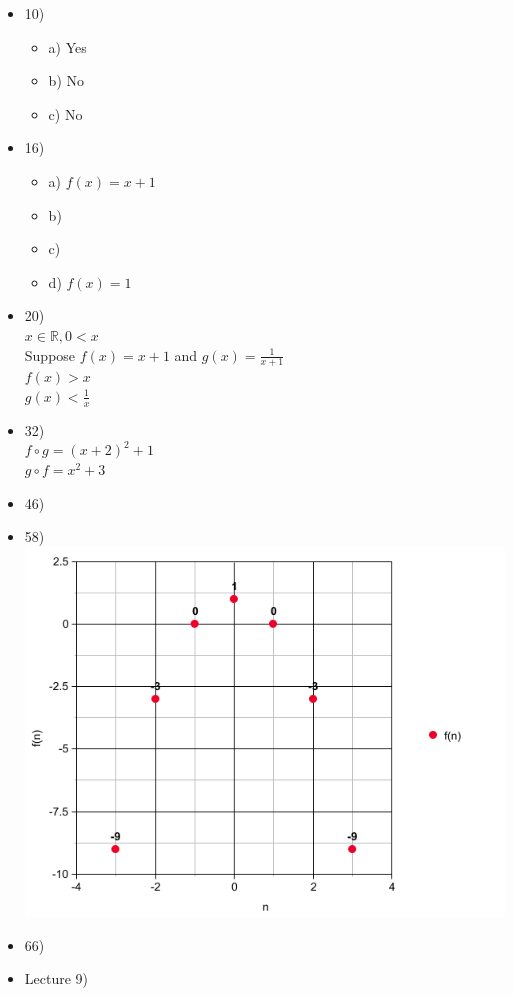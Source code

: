 \documentclass{article}
\begin{document}
\begin{itemize}
	\item
		10)
      \begin{itemize}
        \item
          a) Yes
        \item
          b) No
        \item
          c) No
      \end{itemize}
	\item
		16)
      \begin{itemize}
        \item
          a) $f(x)=x+1$
        \item
          b)
        \item
          c)
        \item
          d) $f(x)=1$
      \end{itemize}
	\item
		20)\\
    $x\in \mathbb{R},0<x$\\
    Suppose $f(x)=x+1$ and $g(x)=\frac{1}{x+1}$\\
    $f(x)>x$\\
    $g(x)<\frac{1}{x}$\\
	\item
		32)\\
    $f\circ g=(x+2)^{2}+1$\\
    $g\circ f=x^{2}+3$
	\item
		46)
	\item
		58)\\
    \includegraphics[scale=0.5]{graph.png}
	\item
		66)
	\item
		Lecture 9)
\end{itemize}
\end{document}
